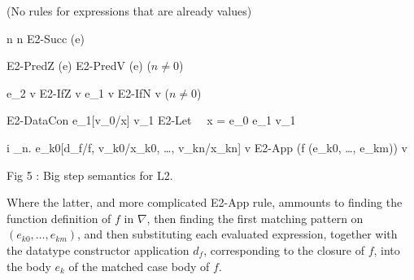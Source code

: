 \begin{center}
        (No rules for expressions that are already values)

          {\nabla\vdash \overline n \EVAL \overline n}
               {E2-Succ} {\nabla\vdash {}(e) \EVAL {}}

               {E2-PredZ} {\nabla\vdash {}(e) \EVAL {}}
               {E2-PredV} {\nabla\vdash {}(e) \EVAL {}
                          }{\scriptsize($n \neq 0$)}

                          {\nabla\vdash e_2 \EVAL v}
               {E2-IfZ}   {\nabla\vdash {} \EVAL v
                          }
                          {\nabla\vdash e_1 \EVAL v}
               {E2-IfN}   {\nabla\vdash {} \EVAL v
                          }{\scriptsize($n \neq 0$)}

            {E2-DataCon}  {\nabla\vdash [c\ e_0 \dots e_i]
                           \EVAL [c\ v_0 \dots v_n]}
                          {\nabla\vdash e_1[v_0/x] \EVAL v_1}
            {E2-Let}      {\nabla\vdash\ \ x = e_0  e_1 \EVAL v_1}

        {\scriptsize
                          {\forall i \in \N_{\leq n}. \nabla{}}
                          {\nabla\vdash e_{k0}[d_f/f, v_{k0}/x_{k0}, \dots, v_{kn}/x_{kn}] \EVAL v}
            {\small E2-App}      {\nabla\vdash (f (e_{k0}, \dots, e_{km})) \EVAL v}
            }

\vspace{.1cm}            Fig 5 : Big step semantics for L2.
\end{center}
Where the latter, and more complicated {E2-App} rule, ammounts to finding
the function definition of $f$ in $\nabla$, then finding the first matching pattern
on $(e_{k0}, \dots, e_{km})$, and then substituting each evaluated expression,
together with the datatype constructor application $d_f$,
corresponding to the closure of $f$, into the body $e_{k}$ of the matched case
body of $f$.


